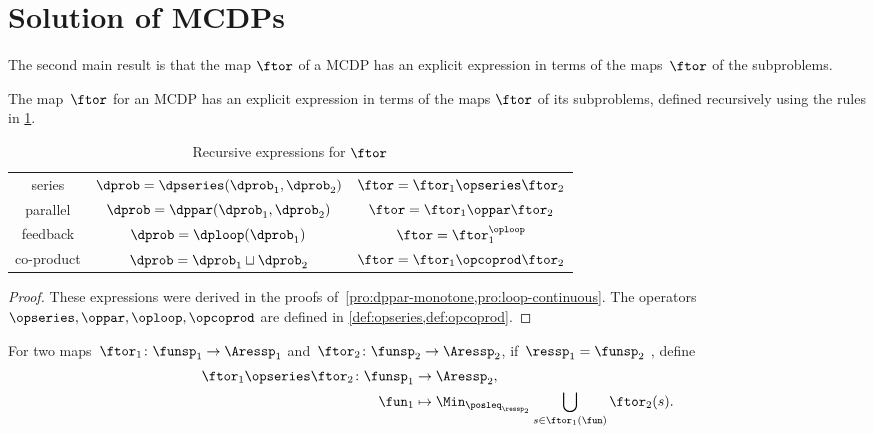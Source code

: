 \section{Solution of MCDPs}
\label{sec:Solution-of-Monotone}

The second main result is that the map $\ftor$ of a MCDP has an explicit
expression in terms of the maps~$\ftor$ of the subproblems.

\noindent

\begin{theorem}
    \label{thm:CDP-solvig}The map~$\ftor$ for an MCDP has an explicit
    expression in terms of the maps $\ftor$ of its subproblems, defined
    recursively using the rules in \cref{tab:Correspondence}.
\end{theorem}

\begin{table}[h]
    \begin{centering}
        \caption{Recursive expressions for $\ftor$\label{tab:Correspondence}}
    \end{centering}
    \centering{}\setlength\extrarowheight{5pt}\normalsize
    \begin{tabular}{ccc}
        series & $\dprob=\dpseries(\dprob_{1},\dprob_{2})$ & $\ftor=\ftor_{1}\opseries\ftor_{2}$\tabularnewline
        parallel & $\dprob=\dppar(\dprob_{1},\dprob_{2})$ & $\ftor=\ftor_{1}\oppar\ftor_{2}$\tabularnewline
        feedback & $\dprob=\dploop(\dprob_{1})$ & $\ftor=\ftor_{1}^{\oploop}$\tabularnewline
        co-product & $\dprob=\dprob_{1}\sqcup\dprob_{2}$ & $\ftor=\ftor_{1}\opcoprod\ftor_{2}$\tabularnewline
    \end{tabular}
\end{table}

\begin{proof}
    These expressions were derived in the proofs of~\cref{pro:dppar-monotone,pro:loop-continuous}.
    The operators $\opseries,\oppar,\oploop,\opcoprod$ are defined
    in \cref{def:opseries,def:opcoprod}.
\end{proof}
\begin{definition}
    \label{def:opseries}
    For two maps~$\ftor_{1}\colon\funsp_{1}\rightarrow\Aressp_{1}$
    and~$\ftor_{2}\colon\funsp_{2}\rightarrow\Aressp_{2}$, if~$\ressp_{1}=\funsp_{2}$
    , define
    \begin{align*}
    {\displaystyle \ftor_{1}\opseries\ftor_{2}\colon\funsp_{1}}
        & \rightarrow\Aressp_{2},\\
        \fun_{1} & \mapsto\Min_{\posleq_{\ressp_{2}}}\bigcup_{s\in\ftor_{1}(\fun)}\ftor_{2}(s).
    \end{align*}
\end{definition}

